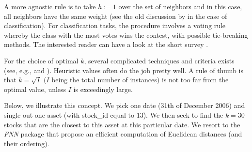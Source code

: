 \documentclass[]{krantz}
\makeatletter
\newenvironment{Shaded}{\begin{snugshade}}{\end{snugshade}}
\newcommand{\CommentTok}[1]{\textcolor[rgb]{0.37,0.37,0.37}{\textit{#1}}}
\newcommand{\DataTypeTok}[1]{\textcolor[rgb]{0.27,0.27,0.27}{#1}}
\newcommand{\DecValTok}[1]{\textcolor[rgb]{0.06,0.06,0.06}{#1}}
\newcommand{\KeywordTok}[1]{\textcolor[rgb]{0.27,0.27,0.27}{\textbf{#1}}}
\newcommand{\NormalTok}[1]{#1}
\newcommand{\OperatorTok}[1]{\textcolor[rgb]{0.43,0.43,0.43}{\textbf{#1}}}
\newcommand{\StringTok}[1]{\textcolor[rgb]{0.5,0.5,0.5}{#1}}
\newenvironment{kframe}{%
\medskip{}
\setlength{\fboxsep}{.8em}
 \def\at@end@of@kframe{}%
 \ifinner\ifhmode%
  \def\at@end@of@kframe{\end{minipage}}%
  \begin{minipage}{\columnwidth}%
 \fi\fi%
 \def\FrameCommand##1{\hskip\@totalleftmargin \hskip-\fboxsep
 \colorbox{shadecolor}{##1}\hskip-\fboxsep
     \hskip-\linewidth \hskip-\@totalleftmargin \hskip\columnwidth}%
 \MakeFramed {\advance\hsize-\width
   \@totalleftmargin\z@ \linewidth\hsize
   \@setminipage}}%
 {\par\unskip\endMakeFramed%
 \at@end@of@kframe}
\renewenvironment{Shaded}{\begin{kframe}}{\end{kframe}}
\theoremstyle{definition}
\theoremstyle{definition}
\theoremstyle{definition}
\theoremstyle{remark}
\makeatother
\begin{document}
A more agnostic rule is to take \(h:=1\) over the set of neighbors and
in this case, all neighbors have the same weight (see the old discussion
by \citet{bailey1978note} in the case of classification). For
classification tasks, the procedure involves a voting rule whereby the
class with the most votes wins the contest, with possible tie-breaking
methods. The interested reader can have a look at the short survey
\citet{bhatia2010survey}.

For the choice of optimal \(k\), several complicated techniques and
criteria exists (see, e.g., \citet{ghosh2006optimum} and
\citet{hall2008choice}). Heuristic values often do the job pretty well.
A rule of thumb is that \(k=\sqrt{I}\) (\(I\) being the total number of
instances) is not too far from the optimal value, unless \(I\) is
exceedingly large.

Below, we illustrate this concept. We pick one date (31th of December
2006) and single out one asset (with stock\_id equal to 13). We then
seek to find the \(k=30\) stocks that are the closest to this asset at
this particular date. We resort to the \emph{FNN} package that propose
an efficient computation of Euclidean distances (and their ordering).

\footnotesize

\begin{Shaded}
\end{Shaded}
\end{document}
